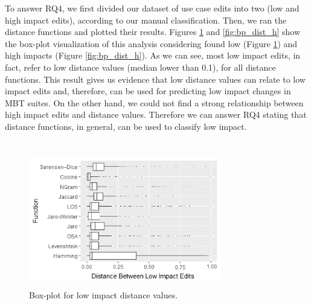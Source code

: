 To answer RQ4, we first divided our dataset of use case edits into two (low and high impact edits), according to our manual classification. Then, we ran the distance functions and plotted their results. Figures \ref{fig:bp_dist_l} and \ref{fig:bp_dist_h} show the box-plot visualization of this analysis considering found low (Figure \ref{fig:bp_dist_l}) and high impacts (Figure \ref{fig:bp_dist_h}). As we can see, most low impact edits, in fact, refer to low distance values (median lower than 0.1), for all distance functions. This result gives us evidence that low distance values can relate to low impact edits and, therefore, can be used for predicting low impact changes in MBT suites. On the other hand, we could not find a strong relationship between high impact edits and distance values. Therefore we can answer RQ4 stating that distance functions, in general, can be used to classify low impact.
\\
\\
\noindent
\vspace{2mm} %
\vspace{2mm}




\begin{figure}[h]
\centering
\includegraphics[height=2.3in,width=3.3in]{figs/Boxplot_SAFF_BZT_LOW2.png}
\caption{Box-plot for low impact distance values.}
\label{fig:bp_dist_l}
\end{figure}

